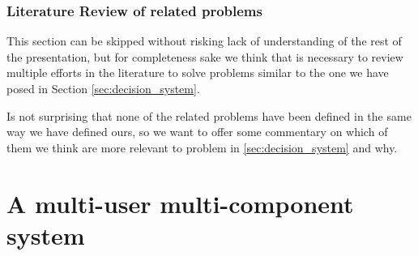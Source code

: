 \subsubsection{Literature Review of related problems}
This section can be skipped without risking lack of understanding of the rest of the presentation, but for completeness sake we think that is necessary to review multiple efforts in the literature to solve problems similar to the one we have posed in Section \ref{sec:decision_system}. 

Is not surprising that none of the related problems have been defined in the same way we have defined ours, so we want to offer some commentary on which of them we think are more relevant to problem in \ref{sec:decision_system} and why.

\section{A multi-user multi-component system}